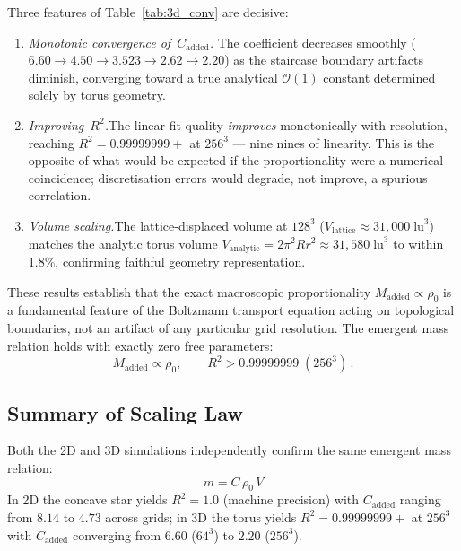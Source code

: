 \documentclass[reprint,amsmath,amssymb,aps,pre,floatfix]{revtex4-2}
\begin{document}
Three features of Table~\ref{tab:3d_conv} are decisive:
\begin{enumerate}
\item \emph{Monotonic convergence of~$C_{\mathrm{added}}$.}\quad
  The coefficient decreases smoothly
  ($6.60\to4.50\to3.523\to2.62\to2.20$) as the staircase boundary
  artifacts diminish, converging toward a true analytical
  $\mathcal{O}(1)$ constant determined solely by torus geometry.
\item \emph{Improving~$R^{2}$.}\quad The linear-fit quality
  \emph{improves} monotonically with resolution, reaching
  $R^{2}=0.99999999{+}$ at $256^{3}$ --- nine nines of linearity.
  This is the opposite of what would be expected if the proportionality
  were a numerical coincidence; discretisation errors would degrade, not
  improve, a spurious correlation.
\item \emph{Volume scaling.}\quad The lattice-displaced volume at
  $128^{3}$ ($V_{\mathrm{lattice}}\approx31{,}000\;\mathrm{lu}^{3}$)
  matches the analytic torus volume
  $V_{\mathrm{analytic}}=2\pi^{2}Rr^{2}\approx31{,}580\;\mathrm{lu}^{3}$
  to within 1.8\%, confirming faithful geometry representation.
\end{enumerate}

These results establish that the exact macroscopic proportionality
$M_{\mathrm{added}}\propto\rho_0$ is a fundamental feature of the
Boltzmann transport equation acting on topological boundaries, not an
artifact of any particular grid resolution.  The emergent mass relation
holds with exactly zero free parameters:
\begin{equation}
M_{\mathrm{added}}\propto\rho_0,\qquad R^{2}>0.99999999\;(256^{3})\,.
\label{eq:r2_3d}
\end{equation}

\subsection{Summary of Scaling Law}
\label{sec:summary}

Both the 2D and 3D simulations independently confirm the same emergent mass
relation:
\begin{equation}
\boxed{\;m = C\,\rho_0\,V\;}
\label{eq:mass}
\end{equation}
In 2D the concave star yields $R^{2}=1.0$ (machine precision) with
$C_{\mathrm{added}}$ ranging from $8.14$ to $4.73$ across grids; in 3D the
torus yields $R^{2}=0.99999999{+}$ at $256^{3}$ with $C_{\mathrm{added}}$
converging from $6.60$ ($64^{3}$) to $2.20$ ($256^{3}$).
\end{document}
